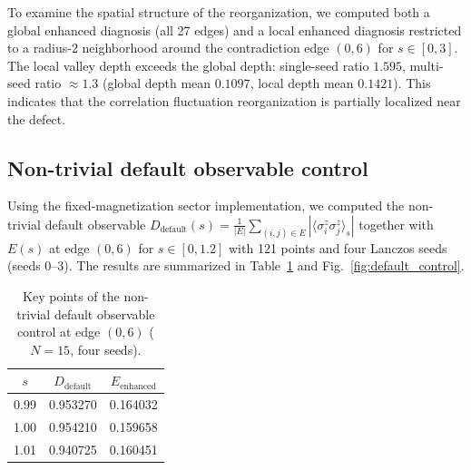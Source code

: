 \documentclass[aps,prb,reprint,superscriptaddress]{revtex4-2}
\begin{document}
To examine the spatial structure of the reorganization, we computed both a global enhanced diagnosis (all 27 edges) and a local enhanced diagnosis restricted to a radius-2 neighborhood around the contradiction edge $(0,6)$ for $s\in[0,3]$. The local valley depth exceeds the global depth: single-seed ratio $1.595$, multi-seed ratio $\approx1.3$ (global depth mean $0.1097$, local depth mean $0.1421$). This indicates that the correlation fluctuation reorganization is partially localized near the defect.

\subsection{Non-trivial default observable control}
\label{sec:default_control}

Using the fixed-magnetization sector implementation, we computed the non-trivial default observable $D_{\text{default}}(s)=\frac{1}{|E|}\sum_{(i,j)\in E}|\langle\sigma_i^z\sigma_j^z\rangle_s|$ together with $E(s)$ at edge $(0,6)$ for $s\in[0,1.2]$ with 121 points and four Lanczos seeds (seeds 0--3). The results are summarized in Table~\ref{tab:default_control} and Fig.~\ref{fig:default_control}.

\begin{table}[t]
\centering
\caption{Key points of the non-trivial default observable control at edge $(0,6)$ ($N=15$, four seeds).}
\label{tab:default_control}
\begin{tabular}{ccc}
\toprule
$s$ & $D_{\text{default}}$ & $E_{\text{enhanced}}$ \\
\midrule
0.99 & 0.953270 & 0.164032 \\
1.00 & 0.954210 & 0.159658 \\
1.01 & 0.940725 & 0.160451 \\
\bottomrule
\end{tabular}
\end{table}
\end{document}

